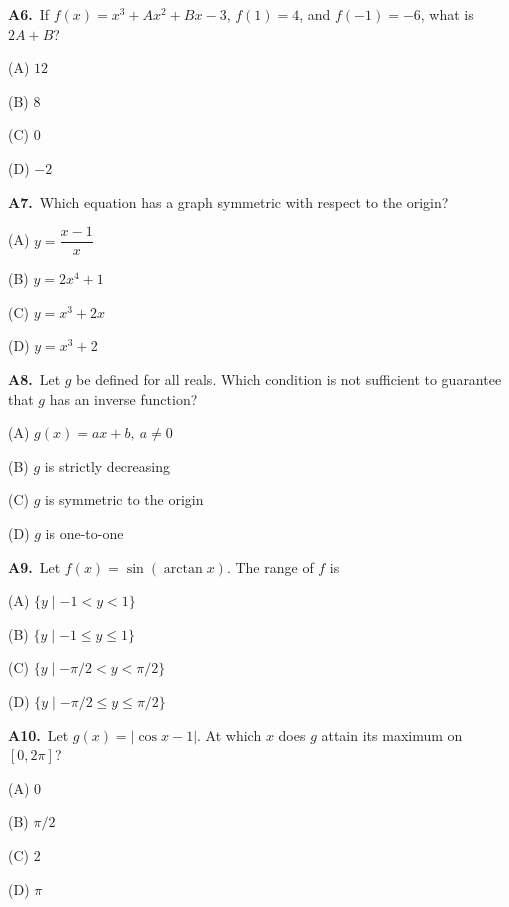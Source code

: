 \documentclass[11pt]{article}
\begin{document}
\bigskip\noindent\textbf{A6.}\ If $f(x)=x^3+Ax^2+Bx-3$, $f(1)=4$, and $f(-1)=-6$, what is $2A+B$?
\begin{list}{}{\setlength{\leftmargin}{3em}\setlength{\labelwidth}{2.5em}\setlength{\itemsep}{0pt}\setlength{\topsep}{2pt}}
\item[(A)] $12$
\item[(B)] $8$
\item[(C)] $0$
\item[(D)] $-2$
\end{list}

\bigskip\noindent\textbf{A7.}\ Which equation has a graph symmetric with respect to the origin?
\begin{list}{}{\setlength{\leftmargin}{3em}\setlength{\labelwidth}{2.5em}\setlength{\itemsep}{0pt}\setlength{\topsep}{2pt}}
\item[(A)] $y=\dfrac{x-1}{x}$
\item[(B)] $y=2x^4+1$
\item[(C)] $y=x^3+2x$
\item[(D)] $y=x^3+2$
\end{list}

\bigskip\noindent\textbf{A8.}\ Let $g$ be defined for all reals. Which condition is not sufficient to guarantee that $g$ has an inverse function?
\begin{list}{}{\setlength{\leftmargin}{3em}\setlength{\labelwidth}{2.5em}\setlength{\itemsep}{0pt}\setlength{\topsep}{2pt}}
\item[(A)] $g(x)=ax+b,\ a\ne0$
\item[(B)] $g$ is strictly decreasing
\item[(C)] $g$ is symmetric to the origin
\item[(D)] $g$ is one-to-one
\end{list}

\bigskip\noindent\textbf{A9.}\ Let $f(x)=\sin(\arctan x)$. The range of $f$ is
\begin{list}{}{\setlength{\leftmargin}{3em}\setlength{\labelwidth}{2.5em}\setlength{\itemsep}{0pt}\setlength{\topsep}{2pt}}
\item[(A)] $\{y\mid-1<y<1\}$
\item[(B)] $\{y\mid-1\le y\le1\}$
\item[(C)] $\{y\mid-\pi/2<y<\pi/2\}$
\item[(D)] $\{y\mid-\pi/2\le y\le\pi/2\}$
\end{list}

\bigskip\noindent\textbf{A10.}\ Let $g(x)=|\cos x-1|$. At which $x$ does $g$ attain its maximum on $[0,2\pi]$?
\begin{list}{}{\setlength{\leftmargin}{3em}\setlength{\labelwidth}{2.5em}\setlength{\itemsep}{0pt}\setlength{\topsep}{2pt}}
\item[(A)] $0$
\item[(B)] $\pi/2$
\item[(C)] $2$
\item[(D)] $\pi$
\end{list}
\end{document}
